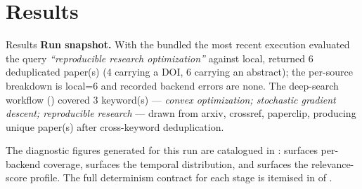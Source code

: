 \documentclass[
  ignorenonframetext,
]{beamer}
\author{\texorpdfstring{}{}}
\date{}
\begin{document}
\section{Results}\label{sec:results}

\begin{frame}{Results}
\textbf{Run snapshot.} With the bundled 
the most recent execution evaluated the query \emph{``reproducible
research optimization''} against local, returned 6 deduplicated paper(s)
(4 carrying a DOI, 6 carrying an abstract); the per-source breakdown is
local=6 and recorded backend errors are none. The deep-search workflow
() covered 3 keyword(s) --- \emph{convex
optimization; stochastic gradient descent; reproducible research} ---
drawn from arxiv, crossref, paperclip, producing unique paper(s) after
cross-keyword deduplication.

The diagnostic figures generated for this run are catalogued in
:  surfaces
per-backend coverage,  surfaces the temporal
distribution, and  surfaces the
relevance-score profile. The full determinism contract for each stage is
itemised in  of .
\end{frame}
\end{document}
